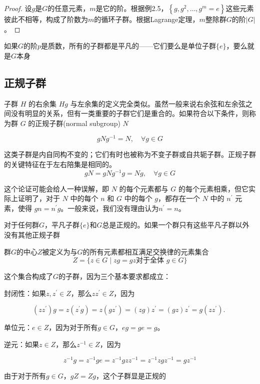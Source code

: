     \begin{proof}
        设$g$是$G$的任意元素，$m$是它的阶。根据例2.5，$\left\{g, g^{2}, \ldots, g^{m}=e\right\}$这些元素彼此不相等，构成了阶数为$m$的循环子群。根据Lagrange定理，$m$整除群$G$的阶$|G|$。
    \end{proof}
    
    \begin{exercise}
        如果$G$的阶$p$是质数，所有的子群都是平凡的——它们要么是单位子群$\{e\}$，要么就是$G$本身
    \end{exercise}
\subsection{正规子群}
子群 $H$ 的右余集 $H g$ 与左余集的定义完全类似。虽然一般来说右余弦和左余弦之间没有明显的关系，但有一类重要的子群它们是重合的。如果符合以下条件，则称为群 $G$ 的正规子群(normal subgroup) $N$

$$
g N g^{-1}=N, \quad \forall g \in G
$$

这类子群是内自同构不变的；它们有时也被称为不变子群或自共轭子群。正规子群的关键特征在于左右陪集是相同的。
$$
g N=g N g^{-1} g=N g, \quad \forall g \in G
$$

这个论证可能会给人一种误解，即 $N$ 的每个元素都与 $G$ 的每个元素相乘，但它实际上证明了，对于 $N$ 中的每个 $n$ 和 $G$ 中的每个 $g$，都存在一个 $N$ 中的 $n^{\prime}$ 元素，使得 $g n=n^{\prime} g$。一般来说，我们没有理由认为$n^{\prime}=n$。

对于任何群$G$，平凡子群$\{e\}$和$G$总是正规的。如果一个群只有这些平凡子群以外没有其他正规子群
\begin{eg}
    群$G$的中心$Z$被定义为与$G$的所有元素都相互满足交换律的元素集合
    $$
Z=\{z \in G \mid z g=g z \text {对于全体 } g \in G\}
$$

这个集合构成了$G$的子群，因为三个基本要求都成立：

封闭性：如果$z, z^{\prime} \in Z$，那么$z z^{\prime} \in Z$，因为

$$
\left(z z^{\prime}\right) g=z\left(z^{\prime} g\right)=z\left(g z^{\prime}\right)=(z g) z^{\prime}=(g z) z^{\prime}=g\left(z z^{\prime}\right) \text {. }
$$

单位元：$e \in Z$，因为对于所有$g \in G$，$e g=g e=g$。

逆元：如果$z \in Z$，那么$z^{-1} \in Z$，因为

$$
z^{-1} g=z^{-1} g e=z^{-1} g z z^{-1}=z^{-1} z g z^{-1}=g z^{-1}
$$

由于对于所有$g \in G$，$g Z=Z g$，这个子群显是正规的
\end{eg}
